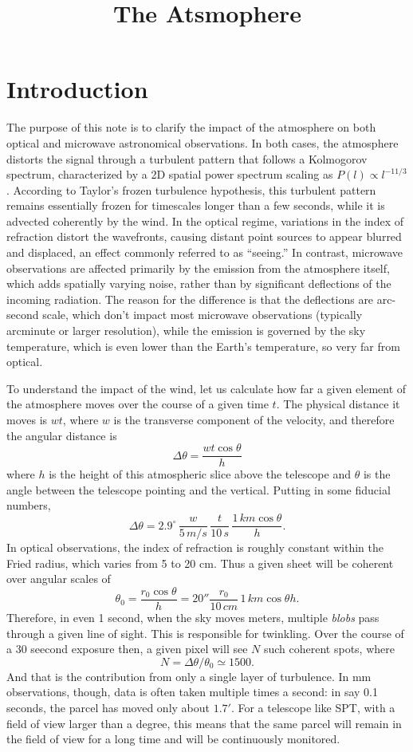 \documentclass[12pt]{article}
\title{The Atsmophere}
\newcommand\be{\begin{equation}}
\newcommand\ee{\end{equation}}
\begin{document}
\section{Introduction}


The purpose of this note is to clarify the impact of the atmosphere on both optical and microwave astronomical observations. In both cases, the atmosphere distorts the signal through a turbulent pattern that follows a Kolmogorov spectrum, characterized by a 2D spatial power spectrum scaling as $P(l)\propto l^{-11/3}$. According to Taylor’s frozen turbulence hypothesis, this turbulent pattern remains essentially frozen for timescales longer than a few seconds, while it is advected coherently by the wind. In the optical regime, variations in the index of refraction distort the wavefronts, causing distant point sources to appear blurred and displaced, an effect commonly referred to as “seeing.” In contrast, microwave observations are affected primarily by the emission from the atmosphere itself, which adds spatially varying noise, rather than by significant deflections of the incoming radiation. The reason for the difference is that the deflections are arc-second scale, which don't impact most microwave observations (typically arcminute or larger resolution), while the emission is governed by the sky temperature, which is even lower than the Earth's temperature, so very far from optical.

To understand the impact of the wind, let us calculate how far a given element of the atmosphere moves over the course of a given time $t$. The physical distance it moves is $wt$, where $w$ is the transverse component of the velocity, and therefore the angular distance is
\be
\Delta\theta = \frac{wt\cos\theta}{h}
\ee
where $h$ is the height of this atmospheric slice above the telescope and $\theta$ is the angle between the telescope pointing and the vertical.
Putting in some fiducial numbers,
\be
\Delta\theta = 2.9^\circ\,\frac{w}{5\,m/s}\,\frac{t}{10\,s}\, \frac{1\,km\cos\theta}{h}.
\ee
In optical observations, the index of refraction is roughly constant within the Fried radius, which varies from 5 to 20 cm. Thus a given sheet will be coherent over angular scales of 
\be
\theta_0= \frac{r_0\cos\theta}{h} = 20''\frac{r_0}{10\,cm}\,{1\,km\cos\theta}{h}.
\ee
Therefore, in even 1 second, when the sky moves meters, multiple {\it blobs} pass through a given line of sight. This is responsible for twinkling. Over the course of a 30 seecond exposure then, a given pixel will see $N$ such coherent spots, where 
\be
N=\Delta\theta/\theta_0\simeq 1500.\ee And that is the contribution from only a single layer of turbulence.
In mm observations, though, data is often taken multiple times a second: in say 0.1 seconds, the parcel has moved only about $1.7'$. For a telescope like SPT, with a field of view larger than a degree, this means that the same parcel will remain in the field of view for a long time and will be continuously monitored.
\end{document}
